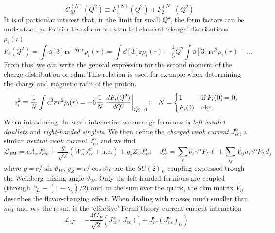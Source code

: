 \begin{refsection}
\begin{equation*}
            \quad 
            G^{(N)}_M(Q^2)\equiv F_1^{(N)}(Q^2)+F_2^{(N)}(Q^2)
        \end{equation*}
        It is of particular interest that, in the limit for small $Q^2$, the form factors can be understood as Fourier transform of extended classical `charge' distributions $\rho_i(r)$
        \begin{equation*}
            F_i(Q^2) = \int \dd[3]\bm{r}e^{-i\bm{q\cdot r}}\rho_i(r) = \int \dd[3]\bm{r}\rho_i(r) +\frac{1}{6}Q^2 \int \dd[3]\bm{r}r^2\rho_i(r)  + \dots
        \end{equation*}
        From this, we can write the general expression for the second moment of the charge distribution or \gls{edm}. This relation is used for example when determining the charge and magnetic radii of the proton. 
        \begin{equation}
            r^2_i\equiv\frac{1}{N}\int \dd[3]\bm{r}r^2\rho_i(r) = -6\frac{1}{N}\evaluated{\frac{dF_i(Q^2)}{dQ^2}}_{Q^2=0};
            \quad
            N=
            \begin{cases}
                1 & \text{if}\ F_i(0)=0,\\
                F_i(0) &\text{else}.
            \end{cases}
        \end{equation}
        When introducing the weak interaction we arrange fermions in \textit{left-handed doublets} and \textit{right-handed singlets}.
        We then define the \textit{charged weak current} $J_{cc}^\alpha$, a similar \textit{neutral weak current} $J_{cn}^\alpha$ and we find
        \begin{equation}
            \mathcal{L}_{EW}=eA_\alpha J_{em}^\alpha + \frac{g}{\sqrt{2}}\left(W^+_\alpha J_{cc}^\alpha+\text{h.c.} \right) + g_zZ_\alpha J^\alpha_{nc};
            \quad
            J^\alpha_{cc}=\sum_\ell \bar{\nu}_\ell\gamma^\alpha P_L\ell+\sum_{ij}V_{ij}\bar{u}_i\gamma^\alpha P_L d_j
        \end{equation}
        where $g=e/\sin{\vartheta_W}$, $g_Z=e/\cos{\vartheta_W}$ are the $SU(2)_L$ coupling  expressed trough the Weinberg mixing angle $\vartheta_W$. Only the left-handed fermions are coupled (through $P_L\equiv (1-\gamma_5)/2$) and, in the sum over the quark, the \gls{ckm} matrix $V_{ij}$ describes the flavor-changing effect.
        When dealing with masses much smaller than $m_W$ and $m_Z$ the result is the `effective' Fermi theory current-current interaction
        \begin{equation}
            \mathcal{L}_{4F}= -\frac{4 G_F}{\sqrt{2}} \left( J_{cc}^\alpha(J_{cc})^\dag_\alpha + J^\alpha_{nc}(J^\alpha_{nc})_\alpha\right)

\end{equation}
\end{refsection}
